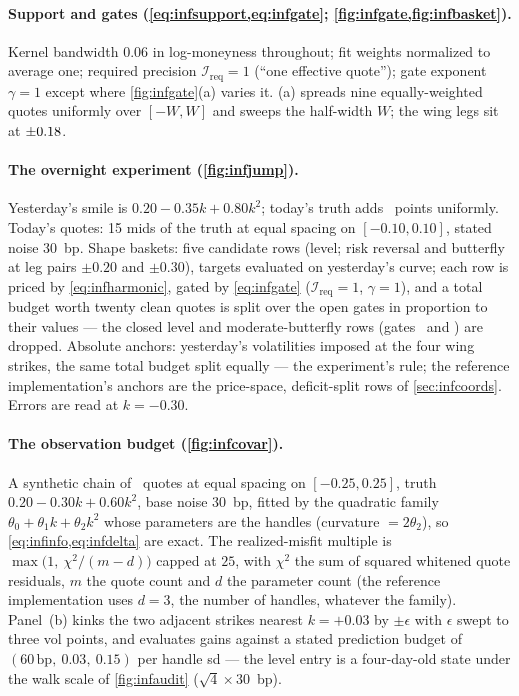 \paragraph{Support and gates
(\cref{eq:infsupport,eq:infgate}; \cref{fig:infgate,fig:infbasket}).}
Kernel bandwidth $0.06$ in log-moneyness throughout; fit weights
normalized to average one; required precision
$\mathcal{I}_{\mathrm{req}}=1$ (``one effective quote''); gate
exponent $\gamma=1$ except where \cref{fig:infgate}(a) varies it.
(a) spreads nine equally-weighted quotes
uniformly over $[-W,W]$ and sweeps the half-width $W$; the wing legs
sit at $\pm0.18$.

\paragraph{The overnight experiment (\cref{fig:infjump}).}
Yesterday's smile is $0.20-0.35k+0.80k^2$; today's truth adds
\MacPriorJumpPts\ points uniformly.  Today's quotes: 15 mids of the
truth at equal spacing on $[-0.10,0.10]$, stated noise 30~bp.  Shape
baskets: five candidate rows (level; risk reversal and butterfly at
leg pairs $\pm0.20$ and $\pm0.30$), targets evaluated on yesterday's
curve; each row is priced by
\cref{eq:infharmonic}, gated by \cref{eq:infgate}
($\mathcal{I}_{\mathrm{req}}=1$, $\gamma=1$), and a total budget
worth twenty clean quotes is split over the open gates in proportion
to their values --- the closed level and moderate-butterfly rows
(gates \MacPriorJumpGateAtm\ and \MacPriorJumpGateBfMod) are
dropped.  Absolute anchors: yesterday's volatilities imposed at the
four wing strikes, the same total budget split equally --- the
experiment's rule; the reference implementation's anchors are the
price-space, deficit-split rows of \cref{sec:infcoords}.  Errors are
read at $k=-0.30$.

\paragraph{The observation budget (\cref{fig:infcovar}).}
A synthetic chain of \MacFiltCovarNq\ quotes at equal spacing on
$[-0.25,0.25]$, truth $0.20-0.30k+0.60k^2$, base noise 30~bp,
fitted by the quadratic family $\theta_0+\theta_1k+\theta_2k^2$
whose parameters are the handles (curvature $=2\theta_2$), so
\cref{eq:infinfo,eq:infdelta} are exact.  The realized-misfit
multiple is
$\max\bigl(1,\ \chi^2/(m-d)\bigr)$ capped at $25$, with $\chi^2$
the sum of squared whitened quote residuals, $m$ the quote count
and $d$ the parameter count (the reference implementation uses
$d=3$, the number of handles, whatever the family).  Panel~(b) kinks the two adjacent
strikes nearest $k=+0.03$ by $\pm\epsilon$ with $\epsilon$ swept to
three vol points, and evaluates gains against a stated prediction
budget of $(60\,\text{bp},\ 0.03,\ 0.15)$ per handle sd --- the
level entry is a four-day-old state under the walk scale of
\cref{fig:infaudit} ($\sqrt{4}\times30$~bp).

